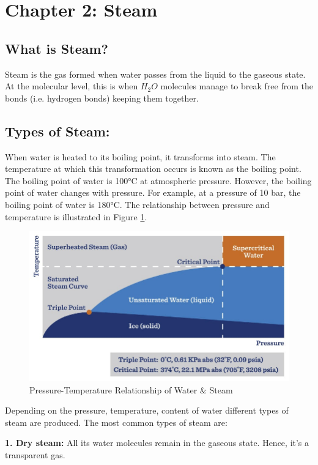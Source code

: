 
\section{Chapter 2: Steam}
\subsection{What is Steam?}
Steam is the gas formed when water passes from the liquid to the gaseous state.
At the molecular level, this is when $H_2O$ molecules manage to break free from the bonds 
(i.e. hydrogen bonds) keeping them together\cite{what_is_steam}\relax.


\subsection{Types of Steam:}
When water is heated to its boiling point, it transforms into steam. The temperature at which this transformation occurs is known as the boiling point. The boiling point of water is 100°C at atmospheric pressure. However, the boiling point of water changes with pressure. For example, at a pressure of 10 bar, the boiling point of water is 180°C. The relationship between pressure and temperature is illustrated in Figure \ref{fig:ptrws}.

\begin{figure}[h!]
    \centering
    \includegraphics[width=\linewidth]{figs/steam.jpg}
    \caption{Pressure-Temperature Relationship of Water \& Steam}
    \label{fig:ptrws}
\end{figure}
Depending on the pressure, temperature, content of water different types of steam are produced. The most common types of steam are:

\textbf{1. Dry steam:} All its water molecules remain in the gaseous state. Hence, it's a transparent gas\cite{steam_types_tlv}.


